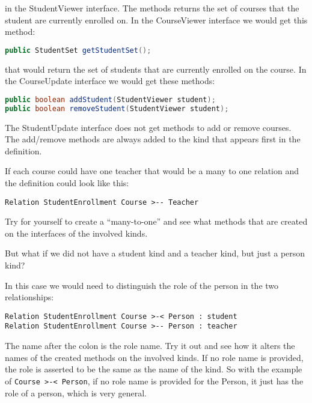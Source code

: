 in the StudentViewer interface. The methods returns the set of courses
that the student are currently enrolled on. In the CourseViewer interface
we would get this method:

\begin{lstlisting}[basicstyle={\scriptsize},language=Java,tabsize=2]
public StudentSet getStudentSet();
\end{lstlisting}


that would return the set of students that are currently enrolled
on the course. In the CourseUpdate interface we would get these methods:

\begin{lstlisting}[basicstyle={\scriptsize},language=Java,tabsize=2]
public boolean addStudent(StudentViewer student);
public boolean removeStudent(StudentViewer student);
\end{lstlisting}


The StudentUpdate interface does not get methods to add or remove
courses. The add/remove methods are always added to the kind that
appears first in the definition.

If each course could have one teacher that would be a many to one
relation and the definition could look like this:

\begin{lstlisting}[basicstyle={\scriptsize},breaklines=true,tabsize=2]
Relation StudentEnrollment Course >-- Teacher
\end{lstlisting}


Try for yourself to create a ``many-to-one'' and see what methods
that are created on the interfaces of the involved kinds.

But what if we did not have a student kind and a teacher kind, but
just a person kind?

In this case we would need to distinguish the role of the person in
the two relationships:

\begin{lstlisting}[basicstyle={\scriptsize},breaklines=true,tabsize=2]
Relation StudentEnrollment Course >-< Person : student
Relation StudentEnrollment Course >-- Person : teacher
\end{lstlisting}


The name after the colon is the role name. Try it out and see how
it alters the names of the created methods on the involved kinds.
If no role name is provided, the role is asserted to be the same as
the name of the kind. So with the example of \texttt{Course >-< Person},
if no role name is provided for the Person, it just has the role of
a person, which is very general.

